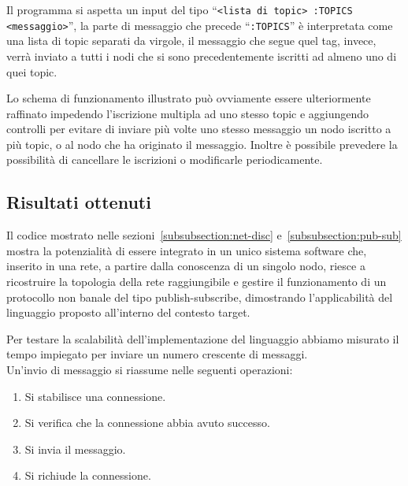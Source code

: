 \documentclass[10pt]{article}
\begin{document}
Il programma si aspetta un input del tipo ``\texttt{<lista di topic> :TOPICS <messaggio>}'', la parte di messaggio che precede ``\texttt{:TOPICS}'' è interpretata come una lista di topic separati da virgole, il messaggio che segue quel tag, invece, verrà inviato a tutti i nodi che si sono precedentemente iscritti ad almeno uno di quei topic.



Lo schema di funzionamento illustrato può ovviamente essere ulteriormente raffinato impedendo l'iscrizione multipla ad uno stesso topic e aggiungendo controlli per evitare di inviare più volte uno stesso messaggio un nodo iscritto a più topic, o al nodo che ha originato il messaggio. Inoltre è possibile prevedere la possibilità di cancellare le iscrizioni o modificarle periodicamente.

\subsection{Risultati ottenuti}\label{subsection:risultati}

Il codice mostrato nelle sezioni~\ref{subsubsection:net-disc} e~\ref{subsubsection:pub-sub} mostra la potenzialità di essere integrato in un unico sistema software che, inserito in una rete, a partire dalla conoscenza di un singolo nodo, riesce a ricostruire la topologia della rete raggiungibile e gestire il funzionamento di un protocollo non banale del tipo publish-subscribe, dimostrando l'applicabilità del linguaggio proposto all'interno del contesto target. 

Per testare la scalabilità dell'implementazione del linguaggio abbiamo misurato il tempo impiegato per inviare un numero crescente di messaggi.\\
Un'invio di messaggio si riassume nelle seguenti operazioni:
\begin{enumerate}
	\item Si stabilisce una connessione.
	\item{Si verifica che la connessione abbia avuto successo.}
	\item Si invia il messaggio. 
	\item Si richiude la connessione.
\end{enumerate}
\end{document}
